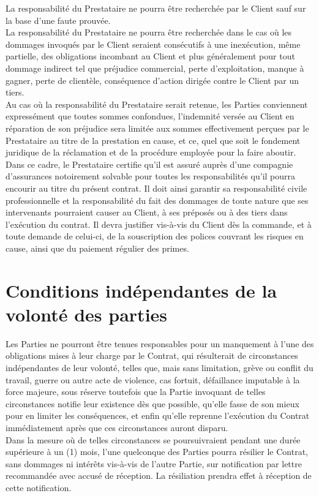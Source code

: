 \documentclass[8pt,french]{base}
\begin{document}
\begin{multicols*}{3}
La responsabilité du Prestataire ne pourra être recherchée par le Client sauf sur la base d’une faute prouvée. \\
La responsabilité du Prestataire ne pourra être recherchée dans le cas où les dommages invoqués par le Client seraient consécutifs à une inexécution, même partielle, des obligations incombant au Client et plus généralement pour tout dommage indirect tel que préjudice commercial, perte d’exploitation, manque à gagner, perte de clientèle, conséquence d’action dirigée contre le Client par un tiers. \\
Au cas où la responsabilité du Prestataire serait retenue, les Parties conviennent expressément que toutes sommes confondues, l’indemnité versée au Client en réparation de son préjudice sera limitée aux sommes effectivement perçues par le Prestataire au titre de la prestation en cause, et ce, quel que soit le fondement juridique de la réclamation et de la procédure employée pour la faire aboutir. \\
Dans ce cadre, le Prestataire certifie qu’il est assuré auprès d’une compagnie d’assurances notoirement solvable pour toutes les responsabilités qu’il pourra encourir au titre du présent contrat. Il doit ainsi garantir sa responsabilité civile professionnelle et la responsabilité du fait des dommages de toute nature que ses intervenants pourraient causer au Client, à ses préposés ou à des tiers dans l’exécution du contrat. Il devra justifier vis-à-vis du Client dès la commande, et à toute demande de celui-ci, de la souscription des polices couvrant les risques en cause, ainsi que du paiement régulier des primes.

\section{Conditions indépendantes de la volonté des parties}

Les Parties ne pourront être tenues responsables pour un manquement à l’une des obligations mises à leur charge par le Contrat, qui résulterait de circonstances indépendantes de leur volonté, telles que, mais sans limitation, grève ou conflit du travail, guerre ou autre acte de violence, cas fortuit, défaillance imputable à la force majeure, sous réserve toutefois que la Partie invoquant de telles circonstances notifie leur existence dès que possible, qu’elle fasse de son mieux pour en limiter les conséquences, et enfin qu’elle reprenne l’exécution du Contrat immédiatement après que ces circonstances auront disparu. \\
Dans la mesure où de telles circonstances se poursuivraient pendant une durée supérieure à un (1) mois, l’une quelconque des Parties pourra résilier le Contrat, sans dommages ni intérêts vis-à-vis de l’autre Partie, sur notification par lettre recommandée avec accusé de réception. La résiliation prendra effet à réception de cette notification.


\end{multicols*}
\end{document}
